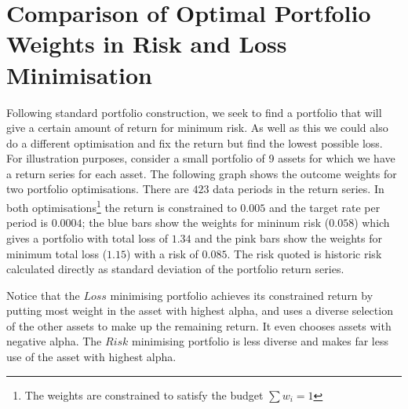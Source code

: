 \documentclass[12pt]{article}
\begin{document}
\section{Comparison of Optimal Portfolio Weights in Risk and Loss Minimisation}
Following standard portfolio construction, we seek to find a portfolio that 
will give a certain amount of return for minimum risk. As well as this we could also do a 
different optimisation and fix the 
return but find the lowest possible loss. For illustration purposes, consider a small portfolio of 9 assets
for which we have a return series for each asset.
The following graph shows the outcome weights for two portfolio optimisations. There are $423$ data periods in the
return series. In both optimisations\footnote{The weights are constrained to satisfy the budget $\sum w_i = 1$} the return is 
constrained to $0.005$ and the target rate per period is $0.0004$; the blue bars show the weights
for mininum risk ($0.058$) which gives a portfolio with total loss of $1.34$ and the pink bars show
the weights for minimum total loss ($1.15$) with a risk of $0.085$. The risk quoted is historic risk 
calculated directly as standard deviation of the portfolio return series.
\break
\break
{}
\break
Notice that the $Loss$ minimising portfolio achieves its constrained return by putting most weight in the
asset with highest alpha, and uses a diverse selection of the other assets to make up the remaining 
return. It even chooses assets with negative alpha. The $Risk$ minimising portfolio is less diverse and makes far less use of the asset with highest alpha.
\end{document}
